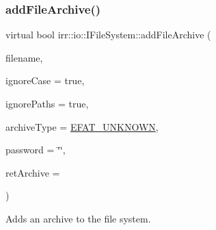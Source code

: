 \subsubsection{\texorpdfstring{add\+File\+Archive()}{addFileArchive()}\hspace{0.1cm}{\footnotesize\ttfamily [2/6]}}
{\footnotesize\ttfamily virtual bool irr\+::io\+::\+I\+File\+System\+::add\+File\+Archive (\begin{DoxyParamCaption}\item[{const \hyperlink{namespaceirr_1_1io_a6468281622ce3a1c46b72e19f32dded5}{path} \&}]{filename,  }\item[{bool}]{ignore\+Case = {\ttfamily true},  }\item[{bool}]{ignore\+Paths = {\ttfamily true},  }\item[{\hyperlink{namespaceirr_1_1io_adb3e3c445ec8e608ed1f0f93306da14f}{E\+\_\+\+F\+I\+L\+E\+\_\+\+A\+R\+C\+H\+I\+V\+E\+\_\+\+T\+Y\+PE}}]{archive\+Type = {\ttfamily \hyperlink{namespaceirr_1_1io_adb3e3c445ec8e608ed1f0f93306da14fa7a4f7d9873f9705cd6dc73191e7d8359}{E\+F\+A\+T\+\_\+\+U\+N\+K\+N\+O\+WN}},  }\item[{const \hyperlink{namespaceirr_1_1core_ab26a0e0359206b5a694f35c37c829d7f}{core\+::stringc} \&}]{password = {\ttfamily \char`\"{}\char`\"{}},  }\item[{\hyperlink{classirr_1_1io_1_1IFileArchive}{I\+File\+Archive} $\ast$$\ast$}]{ret\+Archive = {} }\end{DoxyParamCaption})\hspace{0.3cm}{\ttfamily [pure virtual]}}



Adds an archive to the file system. 

